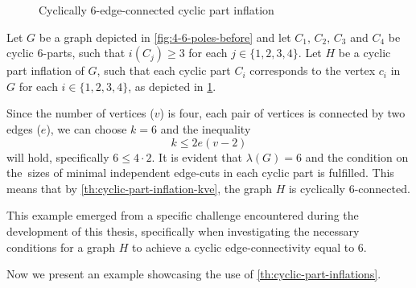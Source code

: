 \documentclass[12pt, twoside]{book}
\begin{document}
\begin{example}
\begin{figure}
		\caption{Cyclically 6-edge-connected cyclic part inflation}
		\label{fig:4-6-poles-inflation}
	\end{figure}

	Let $G$ be a graph depicted in \cref{fig:4-6-poles-before} and let $C_1,\,C_2,\,C_3$ and $C_4$ be cyclic 6-parts, such that $i(C_j)\geq 3$ for each $j\in\{1,2,3,4\}$. Let $H$ be a cyclic part inflation of $G$, such that each cyclic part $C_i$ corresponds to the vertex $c_i$ in $G$ for each $i\in\{1,2,3,4\}$, as depicted in \cref{fig:4-6-poles-inflation}.
	
	Since the number of vertices ($v$) is four, each pair of vertices is connected by two edges ($e$), we can choose $k=6$ and the inequality 
	$$k\leq 2e(v-2)$$
	will hold, specifically $6\leq 4\cdot 2$. It is evident that $\lambda(G)=6$ and the condition on the~sizes of minimal independent edge-cuts in each cyclic part is fulfilled. This means that by \cref{th:cyclic-part-inflation-kve}, the graph $H$ is cyclically 6-connected.
	
	This example emerged from a specific challenge encountered during the development of this thesis, specifically when investigating the necessary conditions for a graph $H$ to achieve a cyclic edge-connectivity equal to 6.
\end{example}

Now we present an example showcasing the use of \cref{th:cyclic-part-inflations}.
\end{document}

